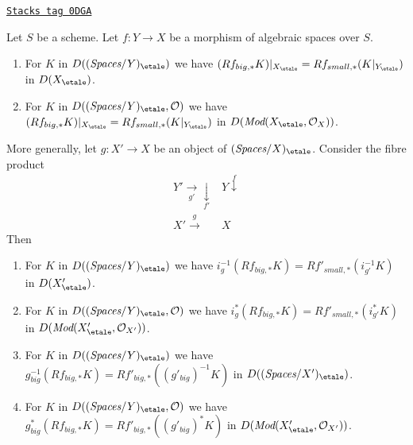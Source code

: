 \begin{lemma}
\label{spaces-more-cohomology-lemma-compare-higher-direct-image}
\href{https://stacks.math.columbia.edu/tag/0DGA}{\texttt{Stacks tag 0DGA}}

Let $S$ be a scheme.
Let $f : Y \to X$ be a morphism of algebraic spaces over $S$.
\begin{enumerate}
\item For $K$ in $D((\textit{Spaces}/Y)_\etale)$ we have
$
(Rf_{big, *}K)|_{X_\etale} = Rf_{small, *}(K|_{Y_\etale})
$
in $D(X_\etale)$.
\item For $K$ in $D((\textit{Spaces}/Y)_\etale, \mathcal{O})$ we have
$
(Rf_{big, *}K)|_{X_\etale} = Rf_{small, *}(K|_{Y_\etale})
$
in $D(\textit{Mod}(X_\etale, \mathcal{O}_X))$.
\end{enumerate}
More generally, let $g : X' \to X$ be an object of
$(\textit{Spaces}/X)_\etale$. Consider the fibre product
$$
\begin{array}{cc}Y' \underset{g'}{\longrightarrow}\underset{f'}{\downarrow} & Y \overset{f}{\downarrow} \\ X' \overset{g}{\longrightarrow} & X\end{array}
$$
Then
\begin{enumerate}
\item[(3)] For $K$ in $D((\textit{Spaces}/Y)_\etale)$ we have
$i_g^{-1}(Rf_{big, *}K) = Rf'_{small, *}(i_{g'}^{-1}K)$
in $D(X'_\etale)$.
\item[(4)] For $K$ in $D((\textit{Spaces}/Y)_\etale, \mathcal{O})$ we have
$i_g^*(Rf_{big, *}K) = Rf'_{small, *}(i_{g'}^*K)$
in $D(\textit{Mod}(X'_\etale, \mathcal{O}_{X'}))$.
\item[(5)] For $K$ in $D((\textit{Spaces}/Y)_\etale)$ we have
$g_{big}^{-1}(Rf_{big, *}K) = Rf'_{big, *}((g'_{big})^{-1}K)$
in $D((\textit{Spaces}/X')_\etale)$.
\item[(6)] For $K$ in $D((\textit{Spaces}/Y)_\etale, \mathcal{O})$ we have
$g_{big}^*(Rf_{big, *}K) = Rf'_{big, *}((g'_{big})^*K)$
in $D(\textit{Mod}(X'_\etale, \mathcal{O}_{X'}))$.
\end{enumerate}
\end{lemma}

